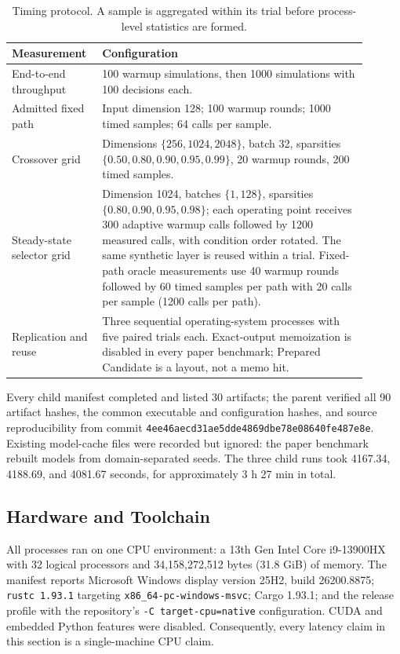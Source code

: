 \documentclass{article}
\begin{document}
\begin{table}[t]
\centering
\caption{Timing protocol. A sample is aggregated within its trial before
process-level statistics are formed.}
\label{tab:timing-config}
\small
\begin{tabular}{p{0.20\linewidth}p{0.70\linewidth}}
\toprule
Measurement & Configuration \\
\midrule
End-to-end throughput &
100 warmup simulations, then 1000 simulations with 100 decisions each. \\
Admitted fixed path &
Input dimension 128; 100 warmup rounds; 1000 timed samples; 64 calls per
sample. \\
Crossover grid &
Dimensions $\{256,1024,2048\}$, batch 32, sparsities
$\{0.50,0.80,0.90,0.95,0.99\}$, 20 warmup rounds, 200 timed samples. \\
Steady-state selector grid &
Dimension 1024, batches $\{1,128\}$, sparsities
$\{0.80,0.90,0.95,0.98\}$; each operating point receives 300 adaptive warmup
calls followed by 1200 measured calls, with condition order rotated. The same
synthetic layer is reused within a trial. Fixed-path oracle measurements use 40
warmup rounds followed by 60 timed samples per path with 20 calls per sample
(1200 calls per path). \\
Replication and reuse &
Three sequential operating-system processes with five paired trials each.
Exact-output memoization is disabled in every paper benchmark; Prepared
Candidate is a layout, not a memo hit. \\
\bottomrule
\end{tabular}
\end{table}

Every child manifest completed and listed 30 artifacts; the parent verified all
90 artifact hashes, the common executable and configuration hashes, and source
reproducibility from commit
\texttt{4ee46aecd31ae5dde4869dbe78e08640fe487e8e}. Existing model-cache files were
recorded but ignored: the paper benchmark rebuilt models from domain-separated
seeds. The three child runs took 4167.34, 4188.69, and 4081.67 seconds, for
approximately 3 h 27 min in total.

\subsection{Hardware and Toolchain}

All processes ran on one CPU environment: a 13th Gen Intel Core i9-13900HX
with 32 logical processors and 34,158,272,512 bytes (31.8 GiB) of memory. The
manifest reports Microsoft Windows display version 25H2, build 26200.8875;
\texttt{rustc 1.93.1} targeting \texttt{x86\_64-pc-windows-msvc}; Cargo 1.93.1;
and the release profile with the repository's
\texttt{-C target-cpu=native} configuration. CUDA and embedded Python features
were disabled. Consequently, every latency claim in this section is a
single-machine CPU claim.
\end{document}
